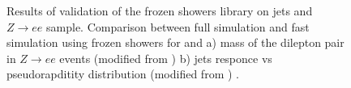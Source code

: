 \begin{figure}[!tbp]
\begin{minipage}[h]{0.49\linewidth}
\end{minipage}
\hfill
\begin{minipage}[h]{0.49\linewidth}
\end{minipage}
\caption{ Results of validation of the frozen showers library on jets and $Z \to ee$ sample. Comparison between full simulation and fast simulation using frozen showers for and a) mass of the dilepton pair in $Z \to ee$ events (modified from \cite{ZeeVal}) b) jets responce vs  pseudorapditity  distribution (modified from \cite{JetsVal}) . }
\label{fig:OtherVal}
\end{figure}
